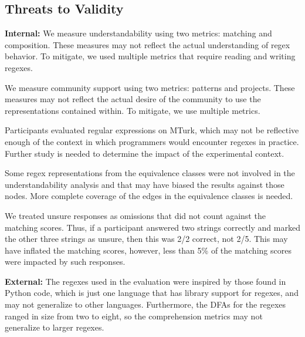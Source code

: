 \subsection{Threats to Validity}

\noindent \textbf{Internal:}
We measure understandability using two metrics: matching and composition. These measures may not reflect the actual understanding of regex behavior. To mitigate, we used multiple metrics that require reading and writing regexes. %

We measure community support using two metrics: patterns and projects. These measures may not reflect the actual desire of the community to use the representations contained within. To mitigate, we use multiple metrics.

Participants evaluated regular expressions on MTurk, which may not be reflective enough of the context in which programmers would encounter regexes in practice. Further study is needed to determine the impact of the experimental context.

Some regex representations from the equivalence classes were not involved in the understandability analysis and that may have biased the results against those nodes.
More complete coverage of the edges in the equivalence classes is needed.

We treated unsure responses as omissions that did not count against the matching scores. Thus, if a participant answered two strings correctly and marked the other three strings as unsure, then this was 2/2 correct, not 2/5. This may have inflated the matching scores, however, less than 5\% of the matching scores were impacted by such responses.





%

\noindent \textbf{External:}
The regexes used in the evaluation were inspired by those found in Python code, which is just one language that has library support for regexes, and may not generalize to other languages. %
Furthermore, the DFAs for the regexes ranged in size from two to eight, so the comprehension metrics may not generalize to larger regexes.%

